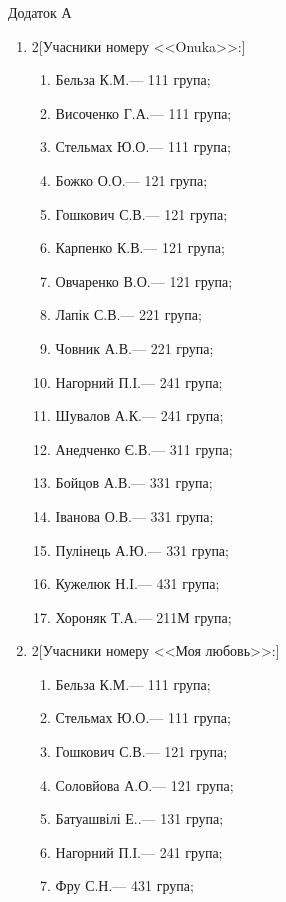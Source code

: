 \documentclass[
	a4paper,
	12pt,
	oneside,
	draft
]{extreport}
\newcommand{\writerTel}[2]{
	\vfill\scriptsize\parindent=-0.5mm
	\par\noindent #1
	\par\noindent #2}
\begin{document}
\newpage
\hfill {Додаток А}

\begin{enumerate}[topsep=0pt,itemsep=-1ex,partopsep=0ex,parsep=1ex]

\item 
\begin{multicols}{2}[Учасники номеру <<Onuka>>:] 
\begin{enumerate}[topsep=0pt,itemsep=-1ex,partopsep=0ex,parsep=1ex,label=\arabic*.]
\item Бельза К.М.\hfill --- 111 група;
\item Височенко Г.А.\hfill --- 111 група;
\item Стельмах Ю.О.\hfill --- 111 група;
\item Божко О.О.\hfill --- 121 група;
\item Гошкович С.В.\hfill --- 121 група;
\item Карпенко К.В.\hfill --- 121 група;
\item Овчаренко В.О.\hfill --- 121 група;
\item Лапік С.В.\hfill --- 221 група;
\item Човник А.В.\hfill --- 221 група;
\item Нагорний П.І.\hfill --- 241 група;
\item Шувалов А.К.\hfill --- 241 група;
\item Анедченко Є.В.\hfill --- 311 група;
\item Бойцов А.В.\hfill --- 331 група;
\item Іванова О.В.\hfill --- 331 група;
\item Пулінець А.Ю.\hfill --- 331 група;
\item Кужелюк Н.І.\hfill --- 431 група;
\item Хороняк Т.А.\hfill --- 211М група;
\end{enumerate}
\end{multicols}

\item 
\begin{multicols}{2}[Учасники номеру <<Моя любовь>>:] 
\begin{enumerate}[topsep=0pt,itemsep=-1ex,partopsep=0ex,parsep=1ex,label=\arabic*.]
\item Бельза К.М.\hfill --- 111 група;
\item Стельмах Ю.О.\hfill --- 111 група;
\item Гошкович С.В.\hfill --- 121 група;
\item Соловйова А.О.\hfill --- 121 група;
\item Батуашвілі Е..\hfill --- 131 група;
\item Нагорний П.І.\hfill --- 241 група;
\item Фру С.Н.\hfill --- 431 група;
\end{enumerate}
\end{multicols}


\end{enumerate}
\end{document}
